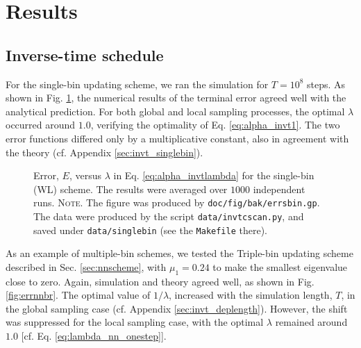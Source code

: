 \documentclass[preprint, floatfix]{revtex4-1}
\newcommand{\note}[1]{{\color{DarkGreen}\footnotesize \textsc{Note.} #1}}
\begin{document}
\section{Results}


\subsection{\label{sec:results_invt}
Inverse-time schedule}



For the single-bin updating scheme, we
ran the simulation for $T = 10^8$ steps.
%
As shown in Fig. \ref{fig:errsbin},
the numerical results of the terminal error agreed well with
the analytical prediction.
%
For both global and local sampling processes,
the optimal $\lambda$ occurred around $1.0$,
verifying the optimality of Eq. \eqref{eq:alpha_invt1}.
%
%
The two error functions
differed only by a multiplicative constant,
also in agreement with the theory
(cf. Appendix \ref{sec:invt_singlebin}).
%


\begin{figure}[h]
\begin{center}
  \caption{
    \label{fig:errsbin}
    Error, $E$, versus $\lambda$
    in Eq. \eqref{eq:alpha_invtlambda}
    for the single-bin (WL) scheme.
    The results were averaged over $1000$ independent runs.
    \note{The figure was produced by \texttt{doc/fig/bak/errsbin.gp}.
      The data were produced by the script \texttt{data/invtcscan.py},
      and saved under \texttt{data/singlebin}
      (see the \texttt{Makefile} there).
    }%
  }
\end{center}
\end{figure}


As an example of multiple-bin schemes,
we tested the Triple-bin updating scheme
described in Sec. \ref{sec:nnscheme},
%
with
$\mu_1 = 0.24$ to make the smallest eigenvalue
close to zero.
%
Again, simulation and theory agreed well,
as shown in Fig. \ref{fig:errnnbr}.
%
The optimal value of $1/\lambda$,
increased with the simulation length, $T$,
in the global sampling case
(cf. Appendix \ref{sec:invt_deplength}).
%
However, the shift was suppressed
for the local sampling case,
with the optimal $\lambda$ remained around $1.0$
[cf. Eq. \eqref{eq:lambda_nn_onestep}].
\end{document}
